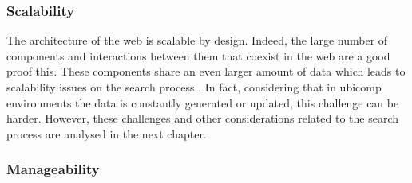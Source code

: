 \subsubsection{Scalability}

The architecture of the web is scalable by design.
Indeed, the large number of components and interactions between them that coexist in the web are a good proof this.
These components share an even larger amount of data which leads to scalability issues on the search process \citep{krummenacher_scalability_2008}. %
In fact, considering that in \ac{ubicomp} environments the data is constantly generated or updated, this challenge can be harder.
However, these challenges and other considerations related to the search process are analysed in the next chapter.





\subsubsection{Manageability}

